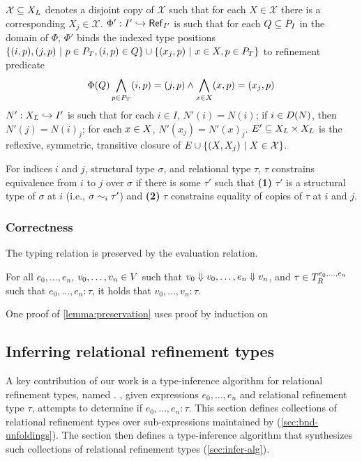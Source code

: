 $\mathcal{X} \subseteq X_L$ denotes a disjoint copy of
$\mathcal{X}$ such that for each $X \in \mathcal{X}$ there is a
corresponding $X_j \in \mathcal{X}$.
$\Phi' : I' \hookrightarrow \mathsf{Ref}_{ I' }$ is such that for each
$Q \subseteq P_{ I }$ in the domain of $\Phi$, $\Phi'$ binds the
indexed type positions
$\{  (i, p), (j, p) \ |\  p \in P_T, (i, p) \in Q  \} \cup
\{  (x_j, p) \ |\  x \in X, p \in P_T  \}$ to refinement predicate
\[ \Phi(Q) \bigland_{p \in \typos} (i, p) = (j, p) \land %
  \bigland_{ x \in \vars } (x, p) = (x_j, p) \]
$N' : X_L \hookrightarrow I'$ is such that %
for each $i \in I$, $N'(i) = N(i)$; %
if $i \in D(N)$, then $N'(j) = N(i)_j$;
for each $x \in X$, $N'(x_j) = N'(x)_j$.
$E' \subseteq X_L \times X_L$ is the reflexive, symmetric,
transitive closure of
$E \cup \{  (X, X_j) \ |\  X \in \mathcal{ X }  \}$.

For indices $i$ and $j$, structural type $\sigma$, and relational type
$\tau$, $\tau$ constrains equivalence from $i$ to $j$ over $\sigma$ if
there is some $\tau'$ such that \textbf{(1)} $\tau'$ is a structural
type of $\sigma$ at $i$ (i.e., $\sigma \sim_{i} \tau'$) and
\textbf{(2)} $\tau$ constrains equality of copies of $\tau$ at $i$ and
$j$.

\subsubsection{Correctness}
\label{sec:corr}

The typing relation is preserved by the evaluation relation.
%
\begin{lemma}
  \label{lemma:preservation}
  For all $e_0, \ldots, e_n$, $v_0, \ldots, v_n \in V$ such that
  $v_0 \Downarrow v_0, \ldots, e_n \Downarrow v_n$, and
  $\tau \in T_{R}^{e_0, \ldots, e_n}$ such that
  $e_0, \ldots, e_n : \tau$, it holds that $v_0, \ldots, v_n : \tau$.
\end{lemma}
%
One proof of \autoref{lemma:preservation} uses proof by induction on
%

\subsection{Inferring relational refinement types}
\label{sec:infer}
%
A key contribution of our work is a type-inference algorithm for
relational refinement types, named \sys.
%
\sys, given expressions $e_0, \ldots, e_n$ and relational refinement
type $\tau$, attempts to determine if $e_0, \ldots, e_n : \tau$.
%
This section defines collections of relational refinement types over
sub-expressions maintained by \sys (\autoref{sec:bnd-unfoldings}).
%
The section then defines a type-inference algorithm that synthesizes
such collections of relational refinement types
(\autoref{sec:infer-alg}).

